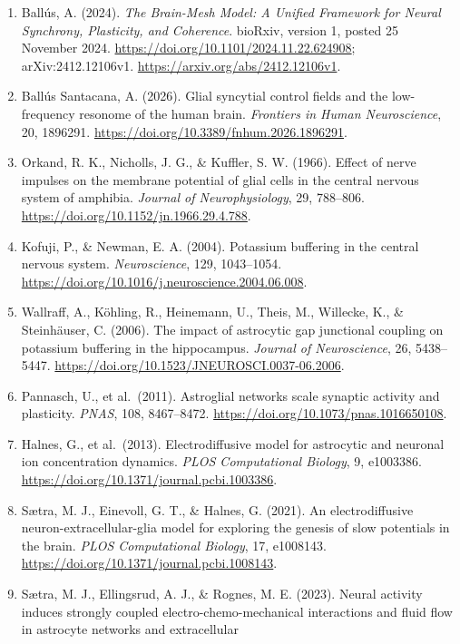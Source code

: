 \documentclass[
  11pt,
]{article}
\begin{document}
\begin{enumerate}
\def\labelenumi{\arabic{enumi}.}
\item
  Ballús, A. (2024). \emph{The Brain-Mesh Model: A Unified Framework for Neural Synchrony, Plasticity, and Coherence}. bioRxiv, version 1, posted 25 November 2024. \url{https://doi.org/10.1101/2024.11.22.624908}; arXiv:2412.12106v1. \url{https://arxiv.org/abs/2412.12106v1}.
\item
  Ballús Santacana, A. (2026). Glial syncytial control fields and the
  low-frequency resonome of the human brain. \emph{Frontiers in Human
  Neuroscience}, 20, 1896291.
  \url{https://doi.org/10.3389/fnhum.2026.1896291}.
\item
  Orkand, R. K., Nicholls, J. G., \& Kuffler, S. W. (1966). Effect of
  nerve impulses on the membrane potential of glial cells in the central
  nervous system of amphibia. \emph{Journal of Neurophysiology}, 29,
  788--806. \url{https://doi.org/10.1152/jn.1966.29.4.788}.
\item
  Kofuji, P., \& Newman, E. A. (2004). Potassium buffering in the
  central nervous system. \emph{Neuroscience}, 129, 1043--1054.
  \url{https://doi.org/10.1016/j.neuroscience.2004.06.008}.
\item
  Wallraff, A., Köhling, R., Heinemann, U., Theis, M., Willecke, K., \&
  Steinhäuser, C. (2006). The impact of astrocytic gap junctional
  coupling on potassium buffering in the hippocampus. \emph{Journal of
  Neuroscience}, 26, 5438--5447.
  \url{https://doi.org/10.1523/JNEUROSCI.0037-06.2006}.
\item
  Pannasch, U., et al.~(2011). Astroglial networks scale synaptic
  activity and plasticity. \emph{PNAS}, 108, 8467--8472.
  \url{https://doi.org/10.1073/pnas.1016650108}.
\item
  Halnes, G., et al.~(2013). Electrodiffusive model for astrocytic and
  neuronal ion concentration dynamics. \emph{PLOS Computational
  Biology}, 9, e1003386.
  \url{https://doi.org/10.1371/journal.pcbi.1003386}.
\item
  Sætra, M. J., Einevoll, G. T., \& Halnes, G. (2021). An
  electrodiffusive neuron-extracellular-glia model for exploring the
  genesis of slow potentials in the brain. \emph{PLOS Computational
  Biology}, 17, e1008143.
  \url{https://doi.org/10.1371/journal.pcbi.1008143}.
\item
  Sætra, M. J., Ellingsrud, A. J., \& Rognes, M. E. (2023). Neural
  activity induces strongly coupled electro-chemo-mechanical
  interactions and fluid flow in astrocyte networks and extracellular

\end{enumerate}
\end{document}
